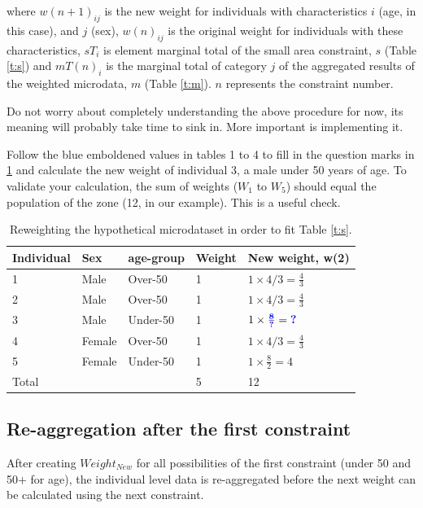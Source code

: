 \documentclass[a4paper, 11pt, twoside]{article}
\begin{document}
where $w(n+1)_{ij}$ is the new weight for individuals with characteristics $i$
(age, in this case), and $j$ (sex),  $w(n)_{ij}$ is the original
weight for individuals with these characteristics, $sT_{i}$ is element
marginal total of the small area constraint, $s$
(Table \ref{t:s}) and $mT(n)_{i}$ is the marginal total of category
$j$ of the aggregated results of the weighted
microdata, $m$ (Table \ref{t:m}).
$n$ represents the constraint number.

Do not worry about completely understanding the above procedure for now, its
meaning will probably take time to sink in.
More important is implementing it.

Follow the blue emboldened values in tables 1 to 4 to fill in the
question marks in \cref{t:new-weights} and calculate the new weight
of individual 3, a male under 50 years of age.
To validate your calculation, the sum of weights ($W_1$ to $W_5$)
should equal the population of the zone (12, in our example). This is a
useful check.

\begin{table}[htbp]
\centering
\caption{Reweighting the hypothetical microdataset in order to fit
Table \ref{t:s}.}
\begin{tabular}{lllll}
\toprule
{Individual} & {Sex} & {age-group} & {Weight} &
{New weight, w(2)} \\ \midrule
1 & Male & Over-50 & 1 & $1 \times 4/3 = \frac{4}{3}$ \\
2 & Male & Over-50 & 1 & $1 \times 4/3 = \frac{4}{3}$ \\
3 & Male & Under-50 & 1 & $1 \times \frac{\textbf{\color{blue}8}}{\textbf{\color{blue}?}} = \textbf{\color{blue}?}$ \\
4 & Female & Over-50 & 1 & $1 \times 4/3 = \frac{4}{3}$ \\
5 & Female & Under-50 & 1 & $1 \times \frac{8}{2} = 4$ \\
\midrule
Total & & & 5 & 12 \\
\bottomrule
\end{tabular}
\label{t:new-weights}
\end{table}

\subsection{Re-aggregation after the first constraint} \label{sreag}
After creating $Weight_{New}$ for all possibilities of the first constraint (under 50 and 50$+$ for age),
the individual level data is re-aggregated before the next weight can be calculated using the next constraint.
\end{document}
